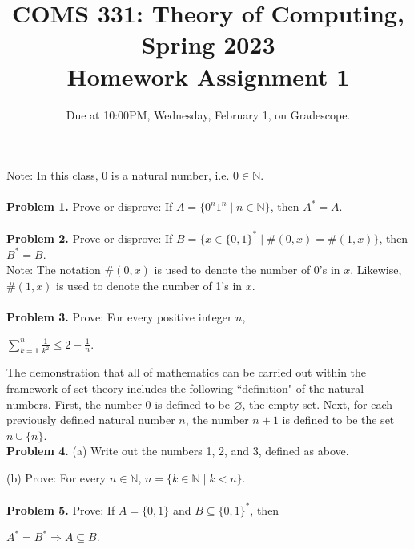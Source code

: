 \documentclass[11pt]{article}
\begin{document}
\title{COMS 331: Theory of Computing, Spring 2023\\
Homework Assignment 1}
\author{Due at 10:00PM, Wednesday, February 1, on Gradescope.\\}
\date{}
\maketitle

Note: In this class, 0 is a natural number, i.e. $0\in\mathbb{N}$.\\\\

{\bf Problem 1.} Prove or disprove: If $A = \{0^n1^n\mid n \in \mathbb{N}\}$, then $A^* = A$.\\\\

{\bf Problem 2.} Prove or disprove: If $B = \{x \in \{0,1\}^*\mid\#(0,x) = \#(1,x)\}$, then $B^* = B$.\\

Note: The notation $\#(0,x)$ is used to denote the number of 0's in $x$. Likewise, $\#(1,x)$ is used to denote the number of 1's in $x$.\\\\

{\bf Problem 3.} Prove: For every positive integer $n$,
\begin{center}
$\displaystyle\sum\limits_{k=1}^n \frac{1}{k^2} \leq 2 - \frac{1}{n}$.
\end{center}

\vspace{0.75cm}

The demonstration that all of mathematics can be carried out within the framework of set theory includes the following ``definition" of the natural numbers. First, the number 0 is defined to be $\varnothing$, the empty set. Next, for each previously defined natural number $n$, the number $n+1$ is defined to be the set $n \cup \{n\}$.\\

{\bf Problem 4.} (a) Write out the numbers 1, 2, and 3, defined as above.

(b) Prove: For every $n \in \mathbb{N}$, $n = \{k \in \mathbb{N} \mid k < n\}$.\\\\

{\bf Problem 5.} Prove: If $A = \{0,1\}$ and $B \subseteq \{0,1\}^*$, then
\begin{center}
$A^* = B^* \Rightarrow A \subseteq B$.
\end{center}
\end{document}
